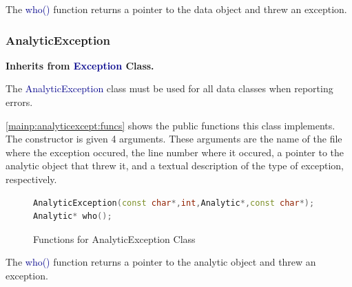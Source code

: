 \documentclass[10pt]{article}
\providecommand{\h}[1]{\textcolor{darkblue}{#1}}
\begin{document}
The \h{who()} function returns a pointer to the data object and threw an 
exception.

\subsubsection{AnalyticException}

\textbf{Inherits from \h{Exception} Class.}

The \h{AnalyticException} class must be used for all data classes when 
reporting errors.

\autoref{mainp:analyticexcept:funcs} shows the public functions this class 
implements. The constructor is given 4 arguments. These arguments are the name 
of the file where the exception occured, the line number where it occured, a 
pointer to the analytic object that threw it, and a textual description of the 
type of exception, respectively.

\begin{figure}[H]
\begin{mdframed}[style=functions]
\begin{lstlisting}[language=C++]
AnalyticException(const char*,int,Analytic*,const char*);
Analytic* who();
\end{lstlisting}
\end{mdframed}
\caption{Functions for AnalyticException Class}
\label{mainp:analyticexcept:funcs}
\end{figure}

The \h{who()} function returns a pointer to the analytic object and threw an 
exception.
\end{document}
